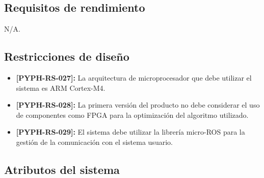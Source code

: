 \documentclass[12pt,a4paper, twosite]{article}
\begin{document}
\subsection{Requisitos de rendimiento}
\label{sec:org94bc543}

N/A.


\subsection{Restricciones de diseño}
\label{sec:org49fe900}



\begin{itemize}
  \item \textbf{[PYPH-RS-027]:} La arquitectura de microprocesador que debe utilizar el sistema
  es ARM Cortex-M4.
  \item \textbf{[PYPH-RS-028]:} La primera versión del producto no debe considerar el uso de
  componentes como FPGA para la optimización del algoritmo utilizado.
  \item \textbf{[PYPH-RS-029]:} El sistema debe utilizar la librería micro-ROS para la gestión
  de la comunicación con el sistema usuario.
\end{itemize}

\subsection{Atributos del sistema}
\label{sec:orgd0babc0}

\end{document}
